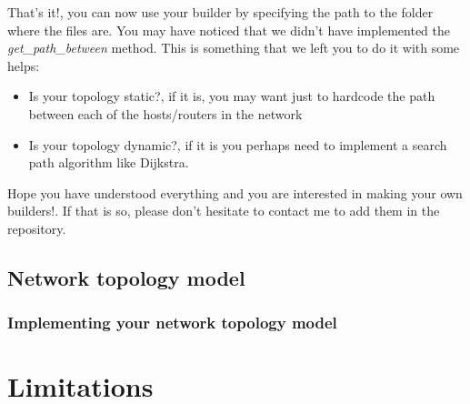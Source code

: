 That's it!, you can now use your builder by specifying the path to the folder where the files are. You may have noticed that we didn't have implemented the \textit{get\_path\_between} method. This is something that we left you to do it with some helps:
\begin{itemize}
\item Is your topology static?, if it is, you may want just to hardcode the path between each of the hosts/routers in the network
\item Is your topology dynamic?, if it is you perhaps need to implement a search path algorithm like Dijkstra.
\end{itemize}

Hope you have understood everything and you are interested in making your own builders!. If that is so, please don't hesitate to contact me to add them in the repository.

\subsection{Network topology model}

\subsubsection{Implementing your network topology model}



\section{Limitations}